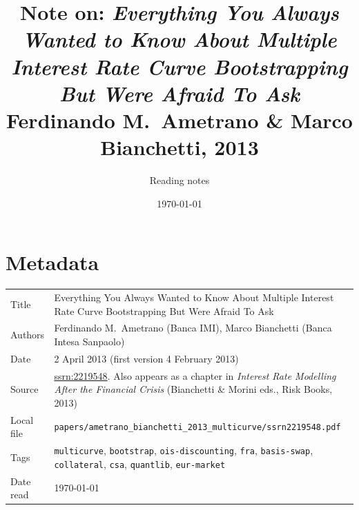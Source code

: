\documentclass[11pt,a4paper]{article}
\title{Note on: \emph{Everything You Always Wanted to Know About Multiple Interest Rate Curve Bootstrapping But Were Afraid To Ask}\\
       \large Ferdinando M.\ Ametrano \& Marco Bianchetti, 2013}
\author{Reading notes}
\date{\today}
\begin{document}
\maketitle

\section*{Metadata}
\begin{tabular}{@{}p{3.5cm}p{11cm}@{}}
\toprule
Title           & Everything You Always Wanted to Know About Multiple Interest Rate Curve Bootstrapping But Were Afraid To Ask \\
Authors         & Ferdinando M.\ Ametrano (Banca IMI), Marco Bianchetti (Banca Intesa Sanpaolo) \\
Date            & 2 April 2013 (first version 4 February 2013) \\
Source          & \href{https://ssrn.com/abstract=2219548}{ssrn:2219548}.
                  Also appears as a chapter in \emph{Interest Rate Modelling After the Financial Crisis} (Bianchetti \& Morini eds., Risk Books, 2013) \\
Local file      & \texttt{papers/ametrano\_bianchetti\_2013\_multicurve/ssrn2219548.pdf} \\
Tags            & \texttt{multicurve}, \texttt{bootstrap}, \texttt{ois-discounting},
                  \texttt{fra}, \texttt{basis-swap}, \texttt{collateral}, \texttt{csa},
                  \texttt{quantlib}, \texttt{eur-market} \\
Date read       & \today \\
\bottomrule
\end{tabular}

\end{document}
